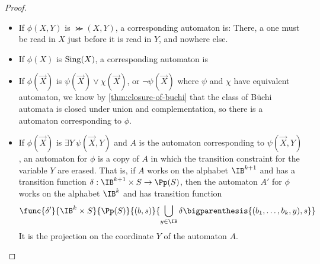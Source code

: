 \begin{proof}
\begin{itemize}
        \item If $\phi(X, Y)$ is $\Succ(X, Y)$,
            a corresponding automaton is:
            There, a one must be read in $X$ just before it is read in $Y$,
            and nowhere else.

        \item If $\phi(X)$ is $\mathrm{Sing}(X)$,
            a corresponding automaton is

        \item If $\phi(\vec X)$ is $\psi(\vec X) \vee \chi(\vec X)$,
            or $\neg \psi(\vec X)$
            where $\psi$ and $\chi$ have equivalent automaton,
            we know by \autoref{thm:closure-of-buchi}
            that the class of Büchi automata
            is closed under union and complementation,
            so there is a automaton corresponding to $\phi$.

        \item If $\phi(\vec X)$ is $\exists Y~ \psi(\vec X, Y)$
            and $A$ is the automaton corresponding to $\psi(\vec X, Y)$,
            an automaton for $\phi$ is a copy of $A$
            in which the transition constraint for the variable $Y$
            are erased. That is, if $A$ works on the alphabet $\IB^{k+1}$
            and has a transition function $\delta: \IB^{k+1} \times S \to \Pp(S)$,
            then the automaton $A'$ for $\phi$ works on the alphabet $\IB^{k}$
            and has transition function \[
                \func{\delta'}{\IB^k \times S}{\Pp(S)}
                    {(b, s)}{
                        \bigcup_{y \in \IB} \delta\bigparenthesis{(b_1, \dots, b_k, y), s}
                    }
            \]
            It is the projection on the coordinate $Y$ of the automaton $A$.
    \end{itemize}

\end{proof}


